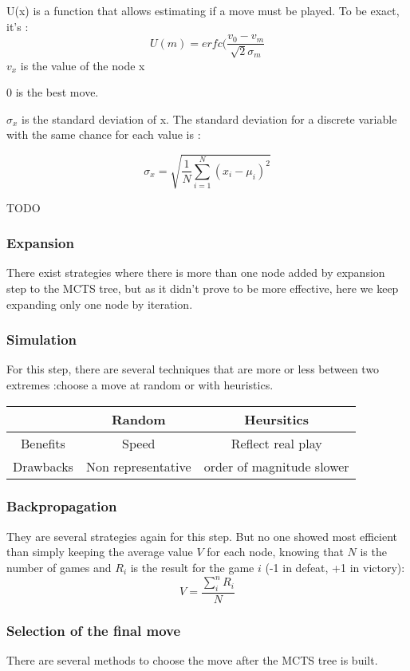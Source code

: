U(x) is a function that allows estimating if a move must be played. To be exact, it's : 
$$
U(m) = erfc(\frac{v_0 -v_m}{\sqrt{2}\sigma_m}
$$
$v_x$ is the value of the node x

0 is the best move. 

$\sigma_x$ is the standard deviation of x. The standard deviation for a discrete variable with the same chance for each value is : 

$$ 
\sigma_x 	= \sqrt{\frac{1}{N} \sum\limits_{i=1}^{N} (x_i-\mu_i)^2}
$$

TODO

\subsubsection{Expansion}
There exist strategies where there is more than one node added by expansion step to the MCTS tree, but as it didn't prove to be more effective, here we keep expanding only one node by iteration.

\subsubsection{Simulation}
For this step, there are several techniques that are more or less between two extremes :choose a move at random or with heuristics. 
\\

\begin{tabular}{c|cc}
    & Random & Heursitics \\
    \hline
   Benefits & Speed & Reflect real play \\
   Drawbacks & Non representative & order of magnitude slower \\
\end{tabular}

\subsubsection{Backpropagation}

They are several strategies again for this step. But no one showed most efficient than simply keeping the average value $V$ for each node, knowing that $N$  is the number of games and $R_i$ is the result for the game $i$ (-1 in defeat, +1 in victory): 
$$
V = \frac{\sum_i^n R_i}{N}
$$

\subsubsection{Selection of the final move}
There are several methods to choose the move after the MCTS tree is built. 

